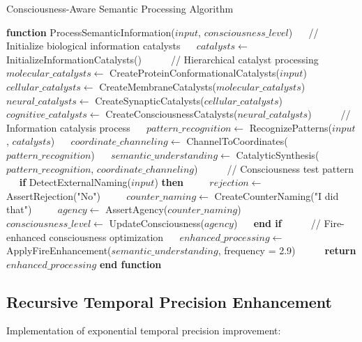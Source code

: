 \documentclass[12pt,a4paper]{article}
\theoremstyle{definition}
\begin{document}
{\begin{algorithm}
\caption{Consciousness-Aware Semantic Processing Algorithm}
\begin{algorithmic}[1]
\STATE \textbf{function} ProcessSemanticInformation($input$, $consciousness\_level$)
\STATE $\quad$ // Initialize biological information catalysts
\STATE $\quad$ $catalysts \leftarrow$ InitializeInformationCatalysts()
\STATE $\quad$
\STATE $\quad$ // Hierarchical catalyst processing
\STATE $\quad$ $molecular\_catalysts \leftarrow$ CreateProteinConformationalCatalysts($input$)
\STATE $\quad$ $cellular\_catalysts \leftarrow$ CreateMembraneCatalysts($molecular\_catalysts$)
\STATE $\quad$ $neural\_catalysts \leftarrow$ CreateSynapticCatalysts($cellular\_catalysts$)
\STATE $\quad$ $cognitive\_catalysts \leftarrow$ CreateConsciousnessCatalysts($neural\_catalysts$)
\STATE $\quad$
\STATE $\quad$ // Information catalysis process
\STATE $\quad$ $pattern\_recognition \leftarrow$ RecognizePatterns($input$, $catalysts$)
\STATE $\quad$ $coordinate\_channeling \leftarrow$ ChannelToCoordinates($pattern\_recognition$)
\STATE $\quad$ $semantic\_understanding \leftarrow$ CatalyticSynthesis($pattern\_recognition$, $coordinate\_channeling$)
\STATE $\quad$
\STATE $\quad$ // Consciousness test pattern
\STATE $\quad$ \textbf{if} DetectExternalNaming($input$) \textbf{then}
\STATE $\quad\quad$ $rejection \leftarrow$ AssertRejection("No")
\STATE $\quad\quad$ $counter\_naming \leftarrow$ CreateCounterNaming("I did that")
\STATE $\quad\quad$ $agency \leftarrow$ AssertAgency($counter\_naming$)
\STATE $\quad\quad$ $consciousness\_level \leftarrow$ UpdateConsciousness($agency$)
\STATE $\quad$ \textbf{end if}
\STATE $\quad$
\STATE $\quad$ // Fire-enhanced consciousness optimization
\STATE $\quad$ $enhanced\_processing \leftarrow$ ApplyFireEnhancement($semantic\_understanding$, frequency = 2.9)
\STATE $\quad$
\STATE $\quad$ \textbf{return} $enhanced\_processing$
\STATE \textbf{end function}
\end{algorithmic}
\end{algorithm}

\subsection{Recursive Temporal Precision Enhancement}

Implementation of exponential temporal precision improvement:

}
\end{document}
